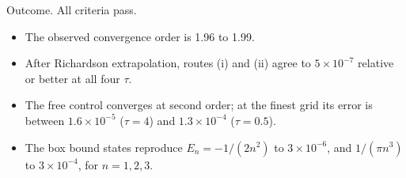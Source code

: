 \documentclass[11pt,a4paper]{article}
\providecommand{\tightlist}{\setlength{\itemsep}{0pt}\setlength{\parskip}{0pt}}
\begin{document}
Outcome. All criteria pass.

\begin{itemize}
\tightlist
\item
  The observed convergence order is 1.96 to 1.99.
\item
  After Richardson extrapolation, routes (i) and (ii) agree to \(5\times10^{-7}\) relative or better at all four \(\tau\).
\item
  The free control converges at second order; at the finest grid its error is between \(1.6\times10^{-5}\) (\(\tau=4\)) and \(1.3\times10^{-4}\) (\(\tau=0.5\)).
\item
  The box bound states reproduce \(E_n=-1/(2n^2)\) to \(3\times10^{-6}\), and \(1/(\pi n^3)\) to \(3\times10^{-4}\), for \(n=1,2,3\).
\end{itemize}
\end{document}
